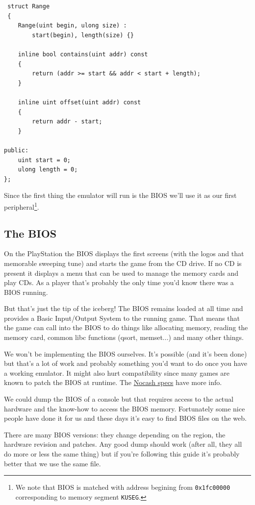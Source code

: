 \documentclass[a4paper]{article}
\newcommand{\code}[1] {\texttt{#1}}
\begin{document}
\begin{lstlisting}
 struct Range
 {
	Range(uint begin, ulong size) :
		start(begin), length(size) {}

	inline bool contains(uint addr) const 
	{
		return (addr >= start && addr < start + length);
	}

	inline uint offset(uint addr) const 
	{
		return addr - start;
	}

public:
	uint start = 0; 
	ulong length = 0;
};
\end{lstlisting}

Since the first thing the emulator will run is the BIOS we'll use it
as our first peripheral\footnote{We note that BIOS is matched with address
 begining from \code{0x1fc00000} corresponding to memory segment \code{KUSEG}.}.

\subsection{The BIOS}

On the PlayStation the BIOS displays the first screens (with the logos
and that memorable sweeping tune) and starts the game from the CD
drive. If no CD is present it displays a menu that can be used to
manage the memory cards and play CDs. As a player that's probably the
only time you'd know there was a BIOS running.

But that's just the tip of the iceberg! The BIOS remains loaded at all
time and provides a Basic Input/Output System to the running
game. That means that the game can call into the BIOS to do things
like allocating memory, reading the memory card, common libc functions
(qsort, memset...) and many other things.

We won't be implementing the BIOS ourselves. It's possible (and it's
been done) but that's a lot of work and probably something you'd want
to do once you have a working emulator. It might also hurt
compatibility since many games are known to patch the BIOS at
runtime. The
\href{http://problemkaputt.de/psx-spx.htm#biospatches}{Nocash specs}
have more info.

We could dump the BIOS of a console but that requires access to the
actual hardware and the know-how to access the BIOS
memory. Fortunately some nice people have done it for us and these
days it's easy to find BIOS files on the web.

There are many BIOS versions: they change depending on the region, the
hardware revision and patches. Any good dump should work (after all,
they all do more or less the same thing) but if you're following this
guide it's probably better that we use the same file.
\end{document}
